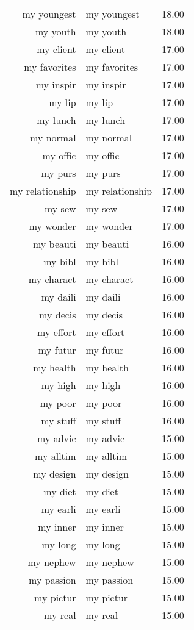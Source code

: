 \begin{table}[ht]
\begin{tabular}{rlr}
  my youngest & my youngest & 18.00 \\ 
  my youth & my youth & 18.00 \\ 
  my client & my client & 17.00 \\ 
  my favorites & my favorites & 17.00 \\ 
  my inspir & my inspir & 17.00 \\ 
  my lip & my lip & 17.00 \\ 
  my lunch & my lunch & 17.00 \\ 
  my normal & my normal & 17.00 \\ 
  my offic & my offic & 17.00 \\ 
  my purs & my purs & 17.00 \\ 
  my relationship & my relationship & 17.00 \\ 
  my sew & my sew & 17.00 \\ 
  my wonder & my wonder & 17.00 \\ 
  my beauti & my beauti & 16.00 \\ 
  my bibl & my bibl & 16.00 \\ 
  my charact & my charact & 16.00 \\ 
  my daili & my daili & 16.00 \\ 
  my decis & my decis & 16.00 \\ 
  my effort & my effort & 16.00 \\ 
  my futur & my futur & 16.00 \\ 
  my health & my health & 16.00 \\ 
  my high & my high & 16.00 \\ 
  my poor & my poor & 16.00 \\ 
  my stuff & my stuff & 16.00 \\ 
  my advic & my advic & 15.00 \\ 
  my alltim & my alltim & 15.00 \\ 
  my design & my design & 15.00 \\ 
  my diet & my diet & 15.00 \\ 
  my earli & my earli & 15.00 \\ 
  my inner & my inner & 15.00 \\ 
  my long & my long & 15.00 \\ 
  my nephew & my nephew & 15.00 \\ 
  my passion & my passion & 15.00 \\ 
  my pictur & my pictur & 15.00 \\ 
  my real & my real & 15.00 \\ 

\end{tabular}
\end{table}
